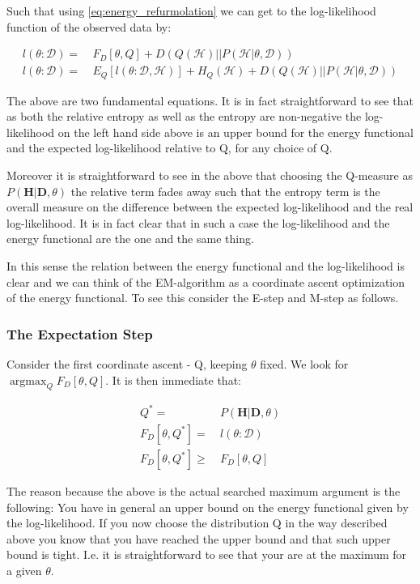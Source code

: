 \documentclass[11pt]{article}
\begin{document}
\begin{article}
Such that using \ref{eq:energy_refurmolation} we can get to the
log-likelihood function of the observed data by:

\begin{align} \label{eq:likelihood_energy_functional_relation}
l (\theta: \mathcal{D}) =& \  F_D[\theta, Q] + D (Q (\mathcal{H}) || P (\mathcal{H}| \theta, \mathcal{D})) \\
l (\theta: \mathcal{D}) =& \  E_Q[l (\theta: \mathcal{D}, \mathcal{H})]+ H_Q (\mathcal {H}) + D (Q (\mathcal{H}) || P (\mathcal{H}| \theta, \mathcal{D}))
\end{align}

The above are two fundamental equations. It is in fact
straightforward to see that as both the relative entropy as well as
the entropy are non-negative the log-likelihood on the left hand
side above is an upper bound for the energy functional and the expected
log-likelihood relative to Q, for any choice of Q.

Moreover it is straightforward to see in the above that choosing the
Q-measure as \(P (\textbf{H}| \textbf{D}, \theta)\) the relative term
fades away such that the entropy term is the overall measure on the
difference between the expected log-likelihood and the real
log-likelihood. It is in fact clear that in such a case the
log-likelihood and the energy functional are the one and the same
thing.

In this sense the relation between the energy functional and the
log-likelihood is clear and we can think of the EM-algorithm as a
coordinate ascent optimization of the energy functional. To see this
consider the E-step and M-step as follows.

\subsubsection{The Expectation Step}
\label{sec:orgb95a745}

Consider the first coordinate ascent - Q, keeping \(\theta\)
fixed. We look for \(\operatorname*{argmax}_{Q} F_D[\theta, Q]\). It
is then immediate that:

\begin{align} \label{eq:q_optimum}
Q^* =& \ P (\textbf{H}|\textbf{D}, \theta) \\
F_D[\theta, Q^*] =& \ l (\theta: \mathcal{D}) \\
F_D[\theta, Q^*] \geq& \ F_D[\theta, Q]
\end{align}

The reason because the above is the actual searched maximum
argument is the following: You have in general an upper bound on
the energy functional given by the log-likelihood. If you now choose
the distribution Q in the way described above you know that you
have reached the upper bound and that such upper bound is
tight. I.e. it is straightforward to see that your are at the
maximum for a given \(\theta\).


\end{article}
\end{document}
